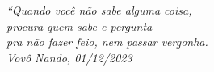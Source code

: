 \begin{epigrafe}
  \vspace*{\fill}
  \begin{flushright}
    \textit{``Quando você não sabe alguma coisa,\\
      procura quem sabe e pergunta\\
      pra não fazer feio, nem passar vergonha.\\
      Vovô Nando, 01/12/2023}
  \end{flushright}
\end{epigrafe}
